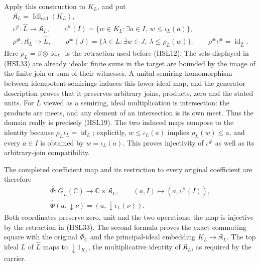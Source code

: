 Apply this construction to $K_L$, and put
\begin{equation}\tag{HSL33}
 \begin{gathered}
 \mathfrak K_L=\operatorname{Idl}_{\mathrm{ord}}(K_L),\\
 \iota^\#:\widehat L\longrightarrow\mathfrak K_L,\qquad
 \iota^\#(I)=
    \{w\in K_L:\exists a\in I,\ w\le\iota_L(a)\},\\
 \rho^\#:\mathfrak K_L\longrightarrow\widehat L,\qquad
 \rho^\#(J)=
    \{\lambda\in L:\exists w\in J,\ \lambda\le\rho_L(w)\},
       \qquad \rho^\#\iota^\#=\operatorname{id}_{\widehat L}.
 \end{gathered}
\end{equation}
Here $\rho_L=\beta\otimes\operatorname{id}_L$ is the
retraction used before (HSL12). The sets displayed in
(HSL33) are already ideals: finite sums in the target
are bounded by the image of the finite join or sum of
their witnesses. A unital semiring homomorphism between
idempotent semirings induces this lower-ideal map, and
the generator description proves that it preserves
arbitrary joins, products, zero and the stated units.
For $L$ viewed as a semiring, ideal multiplication is
intersection: the products are meets, and any element
of an intersection is its own meet. Thus the domain
really is precisely (HSL19).
The two induced maps compose to the identity because
$\rho_L\iota_L=\operatorname{id}_L$; explicitly,
$w\le\iota_L(a)$ implies $\rho_L(w)\le a$, and every
$a\in I$ is obtained by $w=\iota_L(a)$.
This proves injectivity of $\iota^\#$ as well as its
arbitrary-join compatibility.

The completed coefficient map and its restriction to
every original coefficient are therefore
\begin{equation}\tag{HSL34}
 \begin{gathered}
 \widehat\Phi:G_{\widehat L}(\mathbb C)
       \longrightarrow\mathbb C\times\mathfrak K_L,\qquad
       (a,I)\longmapsto(a,\iota^\#(I)),\\
 \widehat\Phi(a,\downarrow\nu)
       =(a,\downarrow\iota_L(\nu)).
 \end{gathered}
\end{equation}
Both coordinates preserve zero, unit and the two operations;
the map is injective by the retraction in (HSL33).
The second formula proves the exact commuting square
with the original $\Phi_{\mathbb C}$ and the principal-ideal
embedding $K_L\to\mathfrak K_L$. The top ideal $L$ of
$\widehat L$ maps to $\downarrow1_{K_L}$, the multiplicative
identity of $\mathfrak K_L$, as required by the carrier.

